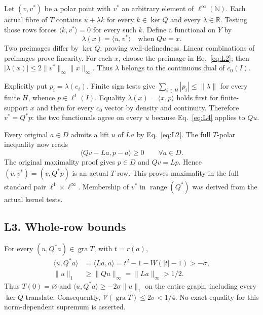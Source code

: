 \documentclass[11pt]{article}
\newcommand{\R}{\mathbb R}
\newcommand{\N}{\mathbb N}
\newcommand{\gra}{\operatorname{gra}}
\newcommand{\pair}[2]{\langle #1,#2\rangle}
\begin{document}
Let $(v,v^*)$ be a polar point with $v^*$ an arbitrary element of
$\ell^\infty(\N)$. Each actual fibre of $T$ contains $u+\lambda k$ for
every $k\in\ker Q$ and every $\lambda\in\R$. Testing those rows forces
$\pair{k}{v^*}=0$ for every such $k$. Define a functional on $Y$ by
\begin{equation}
\lambda(x)=\pair{u}{v^*}\quad\text{when }Qu=x.
\tag{L4}\label{eq:L4}
\end{equation}
Two preimages differ by $\ker Q$, proving well-definedness. Linear
combinations of preimages prove linearity. For each $x$, choose the
preimage in Eq.~\eqref{eq:L2}; then
$|\lambda(x)|\le2\|v^*\|_\infty\|x\|_\infty$. Thus $\lambda$ belongs to
the continuous dual of $c_0(I)$.

Explicitly put $p_i=\lambda(e_i)$. Finite sign tests give
$\sum_{i\in H}|p_i|\le\|\lambda\|$ for every finite $H$, whence
$p\in\ell^1(I)$. Equality $\lambda(x)=\pair{x}{p}$ holds first for
finite-support $x$ and then for every $c_0$ vector by density and continuity.
Therefore $v^*=Q^*p$: the two functionals agree on every $u$ because
Eq.~\eqref{eq:L4} applies to $Qu$.

Every original $a\in D$ admits a lift $u$ of $La$ by Eq.~\eqref{eq:L2}.
The full $T$-polar inequality now reads
\begin{equation}
\pair{Qv-La}{p-a}\ge0\qquad\forall a\in D.
\tag{L5}\label{eq:L5}
\end{equation}
The original maximality proof gives $p\in D$ and $Qv=Lp$. Hence
$(v,v^*)=(v,Q^*p)$ is an actual $T$ row. This proves maximality in the
full standard pair $\ell^1\times\ell^\infty$. Membership of $v^*$ in
$\operatorname{range}(Q^*)$ was derived from the actual kernel tests.

\subsection{L3. Whole-row bounds}
\label{sec:L3}
For every $(u,Q^*a)\in\gra T$, with $t=r(a)$,
\begin{equation}
\begin{aligned}
\pair{u}{Q^*a}&=\pair{La}{a}
 =t^2-1-W(|t|-1)>-\sigma,\\
\|u\|_1&\ge\|Qu\|_\infty=\|La\|_\infty>1/2.
\end{aligned}
\tag{L6}\label{eq:L6}
\end{equation}
Thus $T(0)=\varnothing$ and $\pair{u}{Q^*a}\ge-2\sigma\|u\|_1$ on
the entire graph, including every $\ker Q$ translate. Consequently,
$\mathcal V(\gra T)\le2\sigma<1/4$. No exact equality for this
norm-dependent supremum is asserted.
\end{document}

